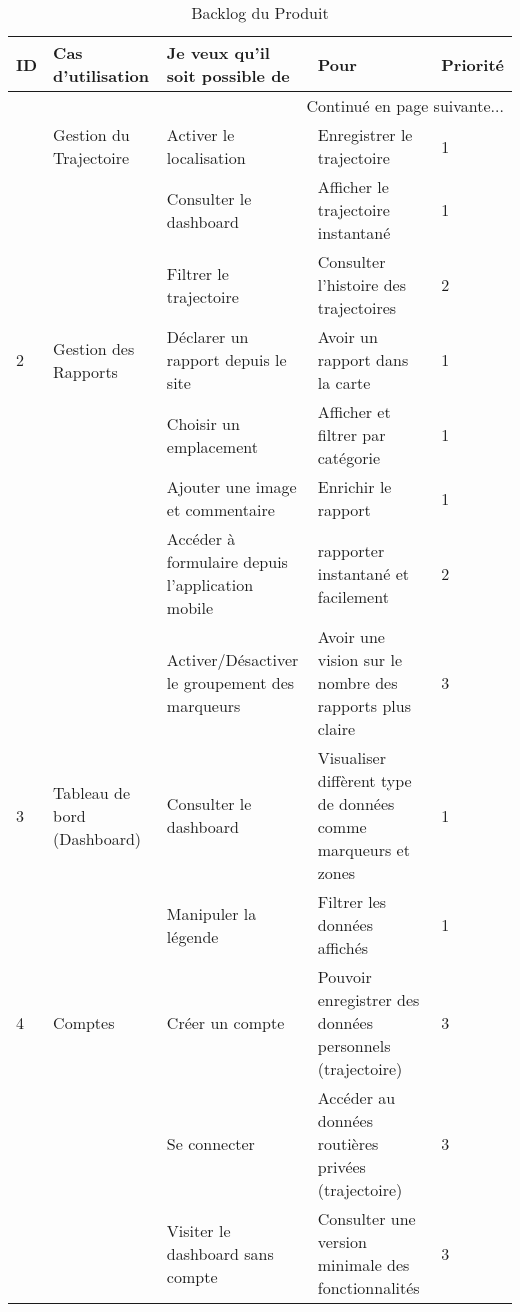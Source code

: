 \begin{center}
    \footnotesize
    \setlength\LTleft{-20pt}
    \begin{longtable}{| l | p{3.5cm} | p{5.5cm} | p{5cm} | l |}
        \caption{Backlog du Produit}
        \label{tab:product-backlog} \\

        \hline
        \textbf{ID} & \textbf{Cas d'utilisation} & \textbf{Je veux qu'il soit possible de} & \textbf{Pour} & \textbf{Priorité} \\ \hline
        \endhead

        \hline \multicolumn{5}{|r|}{{Continué en page suivante$\dotsc$}} \\ \hline
        \endfoot

        \hline \hline
        \endlastfoot

        \hline
1 & Gestion du Trajectoire & Activer le localisation & Enregistrer le trajectoire & 1 \\ \cline{3-5}
&                          & Consulter le dashboard  & Afficher le trajectoire instantané & 1 \\ \cline{3-5}
&                          & Filtrer le trajectoire  & Consulter l'histoire des trajectoires & 2 \\ \hline
2 & Gestion des Rapports   & Déclarer un rapport depuis le site & Avoir un rapport dans la carte & 1 \\ \cline{3-5}
&                          & Choisir un emplacement & Afficher et filtrer par catégorie & 1 \\ \cline{3-5}
&                          & Ajouter une image et commentaire & Enrichir le rapport & 1 \\ \cline{3-5}
&                          & Accéder à formulaire depuis l'application mobile & rapporter instantané et facilement & 2 \\ \cline{3-5}
&                          & Activer/Désactiver le groupement des marqueurs & Avoir une vision sur le nombre des rapports plus claire & 3 \\ \hline
3 & Tableau de bord (Dashboard) & Consulter le dashboard & Visualiser diffèrent type de données comme marqueurs et zones & 1 \\ \cline{3-5}
&                               & Manipuler la légende   & Filtrer les données affichés & 1 \\ \hline
4 & Comptes                & Créer un compte & Pouvoir enregistrer des données personnels (trajectoire) & 3 \\ \cline{3-5}
&                          & Se connecter & Accéder au données routières privées (trajectoire) & 3 \\ \cline{3-5}
&                          & Visiter le dashboard sans compte & Consulter une version minimale des fonctionnalités & 3 \\
        \hline
    \end{longtable}
\end{center}

